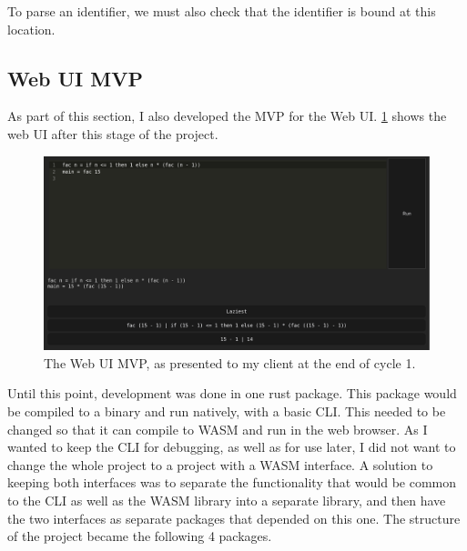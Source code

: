 To parse an identifier, we must also check that the identifier is bound at this location.

\subsection{Web UI \ac{MVP}}
As part of this section, I also developed the MVP for the Web UI. \ref{fig:screenshot_cycle_1_end} shows the web UI after this stage of the project. 

\begin{figure}[h]
    \centering
    \includegraphics[width=1\linewidth]{images/cycle-1-end.png} 
    \captionsetup{justification=centering}
    \caption{The Web UI \ac{MVP}, as presented to my client at the end of cycle 1.}
    \label{fig:screenshot_cycle_1_end}
\end{figure}

Until this point, development was done in one rust package. This package would be compiled to a binary and run natively, with a basic \ac{CLI}. This needed to be changed so that it can compile to \ac{WASM} and run in the web browser. As I wanted to keep the \ac{CLI} for debugging, as well as for use later, I did not want to change the whole project to a project with a \ac{WASM} interface. A solution to keeping both interfaces was to separate the functionality that would be common to the \ac{CLI} as well as the \ac{WASM} library into a separate library, and then have the two interfaces as separate packages that depended on this one. The structure of the project became the following 4 packages. 

